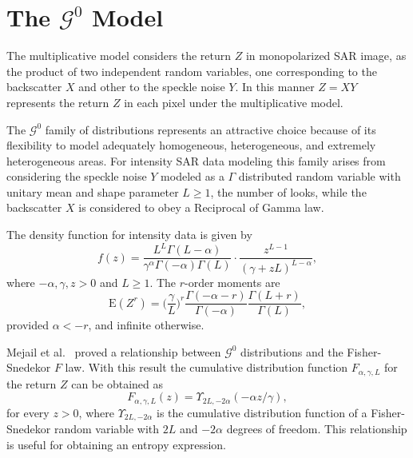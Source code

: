 \documentclass[journal]{IEEEtran}
\begin{document}
\section{The $\mathcal{G}^0$ Model}
\label{sec_SAR}

The multiplicative model considers the return $Z$ in monopolarized SAR image, as the product of two independent random variables, one corresponding to the backscatter $X$ and other to the speckle noise $Y$.
In this manner $Z=X Y$ represents the return $Z$ in each pixel under the multiplicative model.

The $\mathcal{G}^{0}$ family of distributions represents an attractive choice  because of its flexibility to model adequately homogeneous, heterogeneous, and extremely heterogeneous areas\cite{MejailJacoboFreryBustos:IJRS,mejailfreryjacobobustos2001}. 
For intensity SAR data modeling this family arises from considering the speckle noise $Y$ modeled as a $\Gamma$ distributed random variable with unitary mean and shape parameter $L\geq1$, the number of looks, while the backscatter $X$ is considered to obey a Reciprocal of Gamma law. 

The density function for intensity data is given by
\begin{equation}
f(z) =\frac{L^{L}\Gamma ( L-\alpha
	) }{\gamma ^{\alpha }\Gamma ( -\alpha ) \Gamma (
	L) }\cdot  
\frac{z^{L-1}}{( \gamma +zL) ^{L-\alpha }},%
\label{}
\end{equation}
where $-\alpha,\gamma ,z>0$ and $L\geq 1$. 
The $r$-order moments are
\begin{equation}
\text{E}(Z^r) =\Big(\frac{\gamma}{L}\Big)^r\frac{\Gamma ( -\alpha-r )}{ \Gamma (-\alpha) }
\frac{\Gamma (L+r )}{\Gamma (L)},
\label{moments_gI0}
\end{equation}
provided $\alpha<-r$, and infinite otherwise.

Mejail et al.~\cite{MejailJacoboFreryBustos:IJRS} proved a relationship between $\mathcal G^0$ distributions and the Fisher-Snedekor $F$ law.
With this result the cumulative distribution function $F_{\alpha,\gamma,L}$ for the return $Z$   can be obtained as
\begin{equation}
F_{\alpha,\gamma,L}(z) = \Upsilon_{2L, -2\alpha}(-\alpha  z / \gamma),
	\label{eq:CDFG0}
\end{equation}
for every $z>0$, where $\Upsilon_{2L, -2\alpha}$ is the cumulative distribution function of a Fisher-Snedekor random variable with $2L$ and $-2\alpha$ degrees of freedom.
This relationship is useful for obtaining an entropy expression. 
\end{document}
